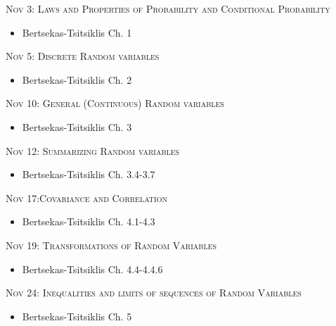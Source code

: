 \documentclass[11pt]{article}
\begin{document}
\noindent \textsc{Nov 3:  Laws and Properties of Probability and Conditional Probability}

\begin{itemize}

\item Bertsekas-Tsitsiklis Ch. 1

\end{itemize}

\noindent \textsc{Nov 5: Discrete Random variables }

\begin{itemize}

 \item Bertsekas-Tsitsiklis Ch. 2  
 


\end{itemize}


\noindent \textsc{Nov 10: General (Continuous) Random variables}

\begin{itemize}
\item Bertsekas-Tsitsiklis Ch. 3 

\end{itemize}


\noindent \textsc{Nov 12:  Summarizing Random variables}

\begin{itemize}
\item Bertsekas-Tsitsiklis Ch. 3.4-3.7 

\end{itemize}


\noindent \textsc{Nov 17:Covariance and Correlation}

\begin{itemize}
\item Bertsekas-Tsitsiklis Ch. 4.1-4.3

\end{itemize}

\noindent \textsc{Nov 19: Transformations of Random Variables }

\begin{itemize}

 \item Bertsekas-Tsitsiklis Ch. 4.4-4.4.6
 
 
\end{itemize}

\noindent \textsc{Nov 24:  Inequalities and limits of sequences of Random Variables}

\begin{itemize}

 \item  Bertsekas-Tsitsiklis Ch. 5


\end{itemize}
\end{document}
